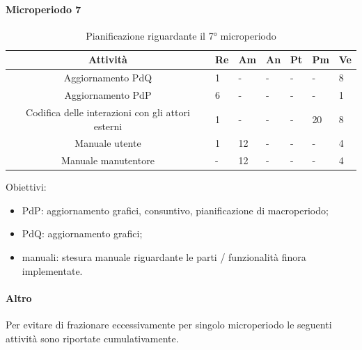 \paragraph{Microperiodo 7}
\begin{table}[H]
	\centering
	\renewcommand{\arraystretch}{1.5}
	\begin{tabular}{|c|p{10mm}|p{10mm}|p{10mm}|p{10mm}|p{10mm}|p{10mm}|}
		\hline
		\rowcolor{lighter-grayer}
		\textbf{Attività}                         & \textbf{Re} & \textbf{Am} & \textbf{An} & \textbf{Pt} & \textbf{Pm} & \textbf{Ve} \\ \hline
		
		Aggiornamento PdQ                                                                                & 1           &      -       &    -         &       -      &     -        & 8           \\ \hline
		Aggiornamento PdP                                                                                & 6           &     -        &      -       &     -        &     -        & 1           \\ \hline
		Codifica delle interazioni con gli attori esterni                                                & 1           &     -        &    -        &     -        & 20          & 8           \\ \hline
		Manuale utente      & 1           & 12          &     -        &       -      &        -     & 4           \\ \hline
		Manuale manutentore &     -        & 12          &    -         &     -        &      -       & 4           \\ \hline

		
	\end{tabular}
	\caption{ Pianificazione riguardante il 7° microperiodo\\}
\end{table}

Obiettivi:
\begin{itemize}
	\item PdP: aggiornamento grafici, consuntivo, pianificazione di macroperiodo;
	\item PdQ: aggiornamento grafici;
	\item manuali: stesura manuale riguardante le parti / funzionalità finora implementate.
\end{itemize}

\paragraph{Altro}
Per evitare di frazionare eccessivamente per singolo microperiodo le seguenti attività sono riportate cumulativamente.


